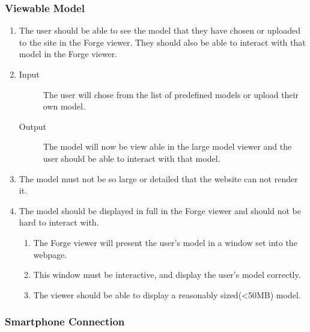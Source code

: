\documentclass[letterpaper, 10pt, draftclsnofoot, compsoc, onecolumn]{IEEEtran}
\begin{document}
\subsubsection{Viewable Model}

\begin{enumerate}
	\item	The user should be able to see the model that they have chosen or uploaded to the site in the Forge viewer. They 
	should also be able to interact with that model in the Forge viewer. 

	\item
	\begin{description}
		\item[Input] The user will chose from the list of predefined models or upload their own model. 
		\item[Output] The model will now be view able in the large model viewer and the user should be able to interact with that model.
	\end{description}

	\item The model must not be so large or detailed that the website can not render it.

	\item The model should be displayed in full in the Forge viewer and should not be hard to interact with. 

	\begin{enumerate}
		\item The Forge viewer will present the user's model in a window set into the webpage. 
		\item This window must be interactive, and display the user's model correctly. 
		\item The viewer should be able to display a reasonably sized(<50MB) model. 
	\end{enumerate}
\end{enumerate}

\subsubsection{Smartphone Connection}
\end{document}

